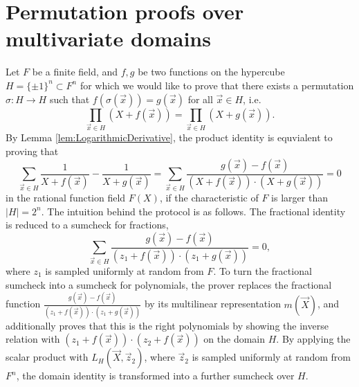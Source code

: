 \documentclass[11pt]{article}
\theoremstyle{definition}
\theoremstyle{remark}
\begin{document}
\section{Permutation proofs over multivariate domains}

Let $F$ be a finite field, and $f, g$ be two functions on the hypercube $H=\{\pm 1\}^n\subset F^n$ for which we would like to prove that there exists a permutation $\sigma: H\rightarrow H$ such that $f(\sigma(\vec x)) = g(\vec x)$ for all $\vec x\in H$, i.e.
\[
\prod_{\vec x \in H} (X + f(\vec x)) = \prod_{\vec x \in H} (X + g(\vec x)). 
\]
By Lemma \ref{lem:LogarithmicDerivative}, the product identity is equvialent to proving that
\begin{equation}
\label{e:FractionalIdentityPermutation}
\sum_{\vec x\in H} \frac{1}{X + f(\vec x)} - \frac{1}{X + g(\vec x)} = \sum_{\vec x\in H} \frac{g(\vec x) - f(\vec x)}{(X + f(\vec x))\cdot (X + g(\vec x))} = 0
\end{equation}
in the rational function field $F(X)$, if the characteristic of $F$ is larger than $|H|=2^n$.
The intuition behind the protocol is as follows.
The fractional identity is reduced to a sumcheck for fractions, 
\begin{equation*}
\label{e:sumcheckFractions}
\sum_{\vec x\in H} \frac{g(\vec x) - f(\vec x)}{(z_1 + f(\vec x))\cdot (z_1 + g(\vec x))} =0,
\end{equation*}
where $z_1$ is sampled uniformly at random from $F$. 
To turn the fractional sumcheck into a sumcheck for polynomials, the prover replaces 
the fractional function $\frac{g(\vec x) - f(\vec x)}{(z_1 + f(\vec x))\cdot (z_1 + g(\vec x))}$ by its multilinear representation $m(\vec X)$, and additionally proves that this is the right polynomials by showing the inverse relation with $(z_1 + f(\vec x))\cdot (z_2 + f(\vec x))$ on the domain $H$.
By applying the scalar product with $L_H(\vec X, \vec z_2)$, where $\vec z_2$ is sampled uniformly at random from $F^n$, the domain identity is transformed into a further sumcheck over $H$.
\end{document}
